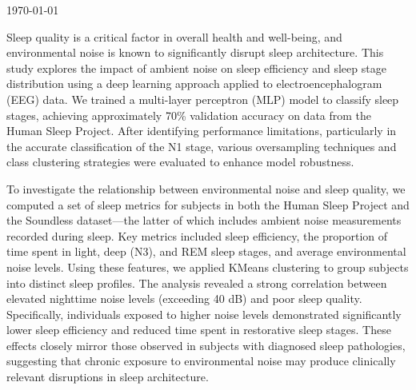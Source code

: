 \begin{titlepage}
	
	
	\vfill\vfill\vfill %
	
	{\large\today} %
	
	
	 
	
	\vfill %
	
\end{titlepage}



\tableofcontents
{}
Sleep quality is a critical factor in overall health and well-being, and environmental noise is known to significantly disrupt sleep architecture. This study explores the impact of ambient noise on sleep efficiency and sleep stage distribution using a deep learning approach applied to electroencephalogram (EEG) data. We trained a multi-layer perceptron (MLP) model to classify sleep stages, achieving approximately 70\% validation accuracy on data from the Human Sleep Project. After identifying performance limitations, particularly in the accurate classification of the N1 stage, various oversampling techniques and class clustering strategies were evaluated to enhance model robustness.

To investigate the relationship between environmental noise and sleep quality, we computed a set of sleep metrics for subjects in both the Human Sleep Project and the Soundless dataset—the latter of which includes ambient noise measurements recorded during sleep. Key metrics included sleep efficiency, the proportion of time spent in light, deep (N3), and REM sleep stages, and average environmental noise levels. Using these features, we applied KMeans clustering to group subjects into distinct sleep profiles. The analysis revealed a strong correlation between elevated nighttime noise levels (exceeding 40 dB) and poor sleep quality. Specifically, individuals exposed to higher noise levels demonstrated significantly lower sleep efficiency and reduced time spent in restorative sleep stages. These effects closely mirror those observed in subjects with diagnosed sleep pathologies, suggesting that chronic exposure to environmental noise may produce clinically relevant disruptions in sleep architecture.

